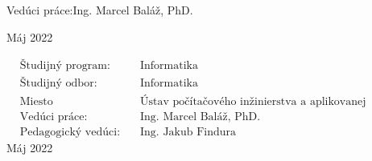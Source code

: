 \documentclass[12pt, a4paper, twoside, openright, slovak]{book}
\newcommand{\emptypage}{\newpage\thispagestyle{empty}\mbox{}\newpage}
\newcommand{\Supervisor}[0] {Ing. Marcel Baláž, PhD.}
\newcommand{\PedagogicalSupervisor}[0] {Ing. Jakub Findura}
\newcommand{\Date}[0] {Máj 2022}
\newcommand{\StudyProgramme}[0] {Informatika}
\newcommand{\StudyField}[0] {Informatika}
\newcommand{\Institute}[0] {Ústav počítačového inžinierstva a aplikovanej informatiky}
\begin{document}

\begin{flushleft}
Vedúci práce:\quad \Supervisor{\Large \par}
\vspace{\medskipamount}
\Date
\end{flushleft}
\emptypage 


\begin{flushleft}
{\setlength{\mathindent}{0.1cm}
\begin{align*}
& \text{Študijný program:} && \text{\StudyProgramme} \\
& \text{Študijný odbor:} && \text{\StudyField} \\
& \text{Miesto vypracovania:} && \text{\Institute} \\
& \text{Vedúci práce:} && \text{\Supervisor} \\
& \text{Pedagogický vedúci:} && \text{\PedagogicalSupervisor}
\end{align*}}
\vspace{2\bigskipamount}
\Date
\end{flushleft}
\emptypage

\newpage
\thispagestyle{empty}

\newpage

\emptypage
{}





\renewcommand{\contentsname}{Obsah}
\pagestyle{empty}
\tableofcontents{}
\listoffigures
\listofmyequations
\emptypage
\pagestyle{fancy}













\printbibliography[title={Literatúra}]


\end{document}
